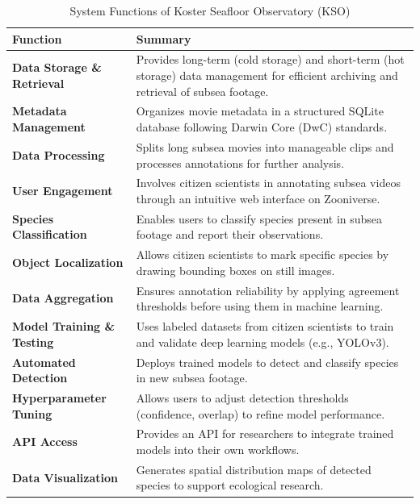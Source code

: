 \begin{table}[H]
    \centering
    \footnotesize
    \renewcommand{\arraystretch}{1.2}
    \begin{tabular}{|l|p{10cm}|}
        \hline
        \textbf{Function} & \textbf{Summary} \\
        \hline
        \textbf{Data Storage \& Retrieval} & Provides long-term (cold storage) and short-term (hot storage) data management for efficient archiving and retrieval of subsea footage. \\
        \hline
        \textbf{Metadata Management} & Organizes movie metadata in a structured SQLite database following Darwin Core (DwC) standards. \\
        \hline
        \textbf{Data Processing} & Splits long subsea movies into manageable clips and processes annotations for further analysis. \\
        \hline
        \textbf{User Engagement} & Involves citizen scientists in annotating subsea videos through an intuitive web interface on Zooniverse. \\
        \hline
        \textbf{Species Classification} & Enables users to classify species present in subsea footage and report their observations. \\
        \hline
        \textbf{Object Localization} & Allows citizen scientists to mark specific species by drawing bounding boxes on still images. \\
        \hline
        \textbf{Data Aggregation} & Ensures annotation reliability by applying agreement thresholds before using them in machine learning. \\
        \hline
        \textbf{Model Training \& Testing} & Uses labeled datasets from citizen scientists to train and validate deep learning models (e.g., YOLOv3). \\
        \hline
        \textbf{Automated Detection} & Deploys trained models to detect and classify species in new subsea footage. \\
        \hline
        \textbf{Hyperparameter Tuning} & Allows users to adjust detection thresholds (confidence, overlap) to refine model performance. \\
        \hline
        \textbf{API Access} & Provides an API for researchers to integrate trained models into their own workflows. \\
        \hline
        \textbf{Data Visualization} & Generates spatial distribution maps of detected species to support ecological research. \\
        \hline
    \end{tabular}
    \caption{System Functions of Koster Seafloor Observatory (KSO)}
    \label{tab:kso_system_functions}
\end{table}

